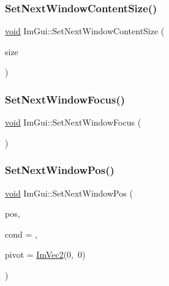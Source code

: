 \mbox{\label{namespaceImGui_aae55a58c38d8e84b10eb1e8b1531372d}} 
\subsubsection{\texorpdfstring{Set\+Next\+Window\+Content\+Size()}{SetNextWindowContentSize()}}
{\footnotesize\ttfamily \hyperlink{imgui__impl__opengl3__loader_8h_ac668e7cffd9e2e9cfee428b9b2f34fa7}{void} Im\+Gui\+::\+Set\+Next\+Window\+Content\+Size (\begin{DoxyParamCaption}\item[{const \hyperlink{structImVec2}{Im\+Vec2} \&}]{size }\end{DoxyParamCaption})}

\mbox{\label{namespaceImGui_ac2d2b163c95cd8c8391aba85bc50d170}} 
\subsubsection{\texorpdfstring{Set\+Next\+Window\+Focus()}{SetNextWindowFocus()}}
{\footnotesize\ttfamily \hyperlink{imgui__impl__opengl3__loader_8h_ac668e7cffd9e2e9cfee428b9b2f34fa7}{void} Im\+Gui\+::\+Set\+Next\+Window\+Focus (\begin{DoxyParamCaption}{ }\end{DoxyParamCaption})}

\mbox{\label{namespaceImGui_afbccd31113430670b5ab2bf0d6f509bf}} 
\subsubsection{\texorpdfstring{Set\+Next\+Window\+Pos()}{SetNextWindowPos()}}
{\footnotesize\ttfamily \hyperlink{imgui__impl__opengl3__loader_8h_ac668e7cffd9e2e9cfee428b9b2f34fa7}{void} Im\+Gui\+::\+Set\+Next\+Window\+Pos (\begin{DoxyParamCaption}\item[{const \hyperlink{structImVec2}{Im\+Vec2} \&}]{pos,  }\item[{Im\+Gui\+Cond}]{cond = {},  }\item[{const \hyperlink{structImVec2}{Im\+Vec2} \&}]{pivot = {\ttfamily \hyperlink{structImVec2}{Im\+Vec2}(0,~0)} }\end{DoxyParamCaption})}

